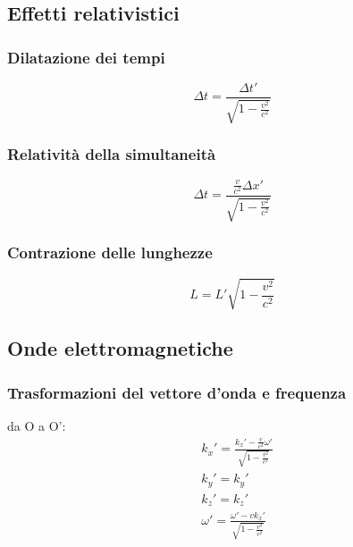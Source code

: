 \documentclass{article}
\begin{document}
\subsection{Effetti relativistici}

\subsubsection{Dilatazione dei tempi}

\begin{equation}
    \Delta t = \frac{\Delta t'}{\sqrt{1-\frac{v^2}{c^2}}}
\end{equation}

\subsubsection{Relatività della simultaneità}

\begin{equation}
    \Delta t = \frac{\frac{v}{c^2}\Delta x'}{\sqrt{1-\frac{v^2}{c^2}}}
\end{equation}

\subsubsection{Contrazione delle lunghezze}

\begin{equation}
    L = L' \sqrt{1-\frac{v^2}{c^2}}
\end{equation}

\subsection{Onde elettromagnetiche}
\subsubsection{Trasformazioni del vettore d'onda e frequenza}
da O a O':
\begin{equation}
    \begin{aligned}
        & k_x'= \frac{k_x'-\frac{v}{c^2}\omega'}{\sqrt{1-\frac{v^2}{c^2}}} \\
        & k_y'= k_y' \\
        & k_z'= k_z' \\
        & \omega'= \frac{\omega'-vk_x'}{\sqrt{1-\frac{v^2}{c^2}}}
    \end{aligned}
\end{equation}
\end{document}
